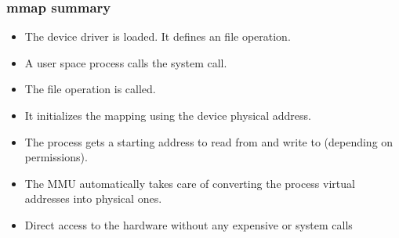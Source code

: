\begin{frame}
  \frametitle{mmap summary}
  \begin{itemize}
  \item The device driver is loaded. It defines an  file
    operation.
  \item A user space process calls the  system call.
  \item The  file operation is called.
  \item It initializes the mapping using the device physical address.
  \item The process gets a starting address to read from and write to
    (depending on permissions).
  \item The MMU automatically takes care of converting the process
    virtual addresses into physical ones.
  \item Direct access to the hardware without any expensive
     or  system calls
  \end{itemize}
\end{frame}

